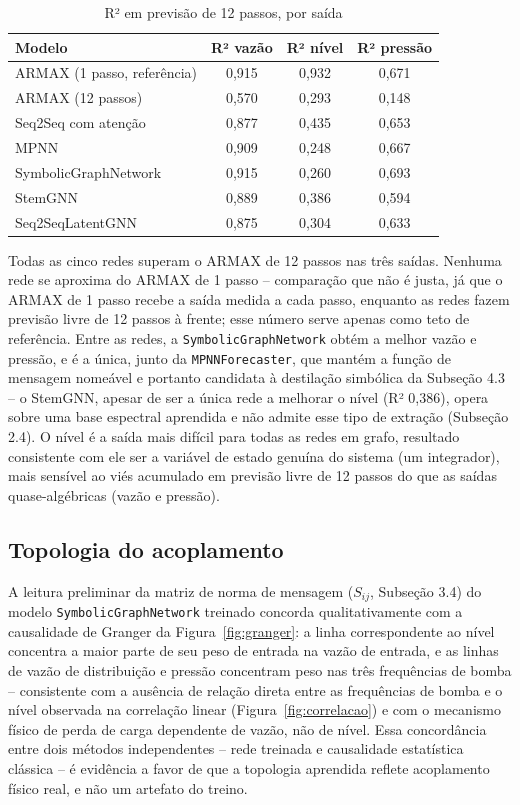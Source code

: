 \documentclass[
	article,		%
	12pt,			%
	oneside,
	a4paper,
	brazil
]{abntex2}
\begin{document}
\begin{table}[htb]
	\caption{R² em previsão de 12 passos, por saída}
	\centering
	{\fontsize{10}{12}\selectfont
	\begin{tabular}{lccc}
		\toprule
		Modelo & R² vazão & R² nível & R² pressão \\
		\midrule
		ARMAX (1 passo, referência) & 0,915 & 0,932 & 0,671 \\
		ARMAX (12 passos) & 0,570 & 0,293 & 0,148 \\
		Seq2Seq com atenção & 0,877 & 0,435 & 0,653 \\
		MPNN & 0,909 & 0,248 & 0,667 \\
		SymbolicGraphNetwork & 0,915 & 0,260 & 0,693 \\
		StemGNN & 0,889 & 0,386 & 0,594 \\
		Seq2SeqLatentGNN & 0,875 & 0,304 & 0,633 \\
		\bottomrule
	\end{tabular}}
	\label{tab:resultados}
\end{table}

Todas as cinco redes superam o ARMAX de 12 passos nas três saídas. Nenhuma
rede se aproxima do ARMAX de 1 passo -- comparação que não é justa, já que
o ARMAX de 1 passo recebe a saída medida a cada passo, enquanto as redes
fazem previsão livre de 12 passos à frente; esse número serve apenas como
teto de referência. Entre as redes, a \texttt{SymbolicGraphNetwork} obtém a
melhor vazão e pressão, e é a única, junto da \texttt{MPNNForecaster}, que
mantém a função de mensagem nomeável e portanto candidata à destilação
simbólica da Subseção 4.3 -- o StemGNN, apesar de ser a única rede a
melhorar o nível (R² 0,386), opera sobre uma base espectral aprendida e não
admite esse tipo de extração (Subseção 2.4). O nível é a saída mais difícil
para todas as redes em grafo, resultado consistente com ele ser a variável
de estado genuína do sistema (um integrador), mais sensível ao viés
acumulado em previsão livre de 12 passos do que as saídas quase-algébricas
(vazão e pressão).

\subsection{Topologia do acoplamento}

A leitura preliminar da matriz de norma de mensagem ($S_{ij}$, Subseção
3.4) do modelo \texttt{SymbolicGraphNetwork} treinado concorda
qualitativamente com a causalidade de Granger da
Figura~\ref{fig:granger}: a linha correspondente ao nível concentra a maior
parte de seu peso de entrada na vazão de entrada, e as linhas de vazão de
distribuição e pressão concentram peso nas três frequências de bomba --
consistente com a ausência de relação direta entre as frequências de bomba
e o nível observada na correlação linear (Figura~\ref{fig:correlacao}) e
com o mecanismo físico de perda de carga dependente de vazão, não de
nível. Essa concordância entre dois métodos independentes -- rede treinada
e causalidade estatística clássica -- é evidência a favor de que a
topologia aprendida reflete acoplamento físico real, e não um artefato do
treino.
\end{document}
